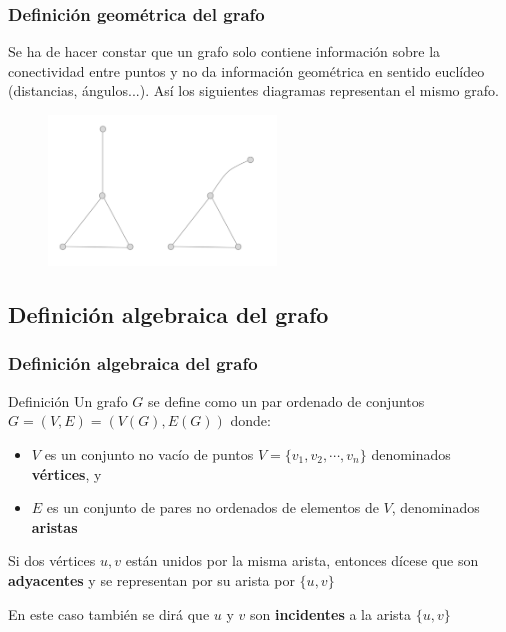 \documentclass{beamer}
\begin{document}
\begin{frame}
\frametitle{Definici\'on geom\'etrica del grafo}

Se ha de hacer constar que un grafo solo contiene informaci\'on sobre la conectividad entre puntos y no da informaci\'on geom\'etrica en sentido eucl\'ideo (distancias, \'angulos...). As\'i los siguientes diagramas representan el mismo grafo.

\begin{figure}[h]
 \label{fig:volumen}
\centering
\includegraphics[height=4cm]{g2}
\end{figure}
\end{frame}



\subsection{Definici\'on algebraica del grafo}
\begin{frame}
\frametitle{Definici\'on algebraica del grafo}

\begin{block}{Definici\'on}
Un grafo $G$ se define como un par ordenado de conjuntos $G=(V,E) = (V(G), E(G))$ donde:
\begin{itemize}
\item $V$ es un conjunto no vac\'io de puntos $V=\{v_1,v_2,\cdots,v_n\}$ denominados \textbf{v\'ertices}, y
\item $E$ es un conjunto de pares no ordenados de elementos de $V$, denominados \textbf{aristas}
\end{itemize}
\end{block}
Si dos v\'ertices $u,v$ est\'an unidos por la misma arista, entonces d\'icese que son \textbf{adyacentes} y se representan por su arista por $\{u,v\}$

En este caso tambi\'en se dir\'a que $u$ y $v$ son \textbf{incidentes} a la arista $\{u,v\}$

\end{frame}
\end{document}
